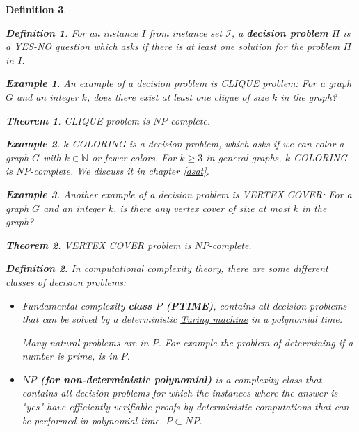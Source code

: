 \documentclass[12pt]{article}
\theoremstyle{slplain}
\newtheorem{theorem}{Theorem}[section]
\newtheorem{defi}{Definition}[section]
\newtheorem{exam}{Example}[section]
\begin{document}
\begin{defi}
\begin{defi}
For an instance $I$ from instance set $\mathcal{I}$, a {\bf decision problem} $\Pi$ is a YES-NO question which asks if
there is at least one solution for the problem $\Pi$ in $I$.
\end{defi}

\begin{exam}
An example of a decision problem is CLIQUE problem: For a graph $G$ and an integer $k$, does there exist at least one clique of size $k$ in the graph? 
\end{exam}

\begin{theorem}
CLIQUE problem is $NP$-complete. \cite{karp}
\end{theorem}

\begin{exam}
$k$-COLORING is a decision problem, which asks if we can color a graph $G$ with $k\in\mathbb{N}$ or fewer colors. For $k \geq 3$ in general graphs, $k$-COLORING is $NP$-complete. We discuss it in chapter \ref{dsat}.
\end{exam}

\begin{exam}
Another example of a decision problem is VERTEX COVER: For a graph $G$ and an integer $k$, is there any vertex cover of size at most $k$ in the graph? 
\end{exam}

\begin{theorem}
VERTEX COVER problem is $NP$-complete. \cite{karp}
\end{theorem}

\begin{defi}
In computational complexity theory, there are some different classes of decision problems:

\begin{itemize}
\item Fundamental complexity {\bf class $P$ (PTIME)}, contains all decision problems that can be solved by a deterministic \href{https://en.wikipedia.org/wiki/Turing_machine}{Turing machine}\cite{turing} in a polynomial time. 

Many natural problems are in $P$. For example the problem of determining if a number is prime, is in $P$\cite{manindra}.

\item {\bf $NP$ (for non-deterministic polynomial)} is a complexity class that contains all decision problems for which the instances where the answer is "yes" have efficiently verifiable proofs by deterministic computations that can be performed in polynomial time. $P\subset NP$.


\end{itemize}
\end{defi}
\end{defi}
\end{document}
